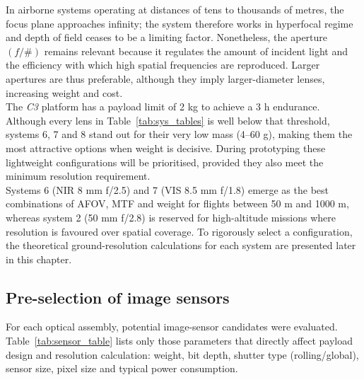 \noindent In airborne systems operating at distances of tens to thousands of
metres, the focus plane approaches infinity; the system therefore works
in hyperfocal regime and depth of field ceases to be a limiting factor.
Nonetheless, the aperture \((f/\#)\) remains relevant because it
regulates the amount of incident light and the efficiency with which
high spatial frequencies are reproduced. Larger apertures are thus
preferable, although they imply larger-diameter lenses, increasing
weight and cost.\\

\noindent The \textit{C3} platform has a payload limit of 2 kg to achieve a 3 h
endurance. Although every lens in Table~\ref{tab:sys_tables} is well
below that threshold, systems 6, 7 and 8 stand out for their very low
mass (4–60 g), making them the most attractive options when weight is
decisive. During prototyping these lightweight configurations will be
prioritised, provided they also meet the minimum resolution
requirement.\\

\noindent Systems 6 (NIR 8 mm f/2.5) and 7 (VIS 8.5 mm f/1.8) emerge as the best
combinations of AFOV, MTF and weight for flights between 50 m and
1000 m, whereas system 2 (50 mm f/2.8) is reserved for high-altitude
missions where resolution is favoured over spatial coverage. To rigorously
select a configuration, the theoretical ground-resolution calculations
for each system are presented later in this chapter.\\ 

\subsection{Pre-selection of image sensors}
\label{sec:sensor_selection}

For each optical assembly, potential image-sensor candidates were
evaluated.  Table~\ref{tab:sensor_table} lists only those parameters
that directly affect payload design and resolution calculation: weight,
bit depth, shutter type (rolling/global), sensor size, pixel size and
typical power consumption.\\

